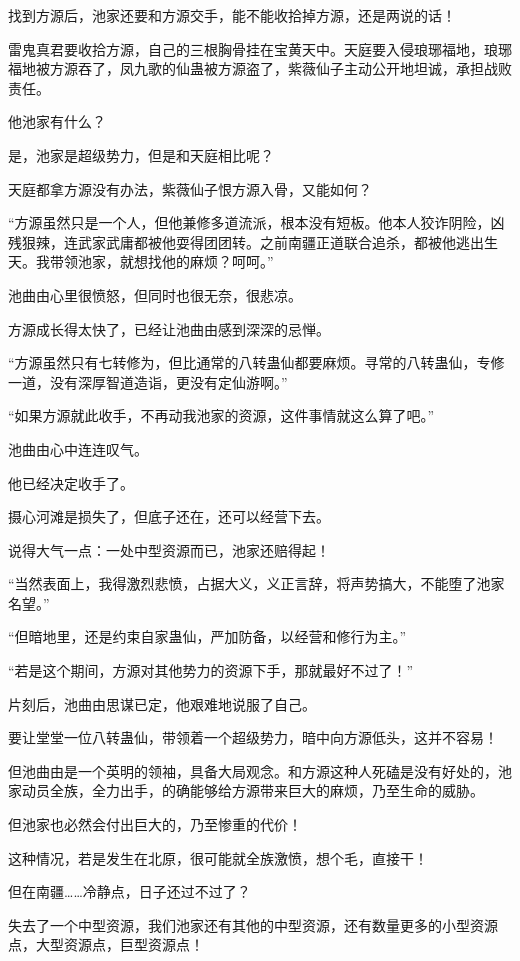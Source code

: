 \begin{this_body}
找到方源后，池家还要和方源交手，能不能收拾掉方源，还是两说的话！

雷鬼真君要收拾方源，自己的三根胸骨挂在宝黄天中。天庭要入侵琅琊福地，琅琊福地被方源吞了，凤九歌的仙蛊被方源盗了，紫薇仙子主动公开地坦诚，承担战败责任。

他池家有什么？

是，池家是超级势力，但是和天庭相比呢？

天庭都拿方源没有办法，紫薇仙子恨方源入骨，又能如何？

“方源虽然只是一个人，但他兼修多道流派，根本没有短板。他本人狡诈阴险，凶残狠辣，连武家武庸都被他耍得团团转。之前南疆正道联合追杀，都被他逃出生天。我带领池家，就想找他的麻烦？呵呵。”

池曲由心里很愤怒，但同时也很无奈，很悲凉。

方源成长得太快了，已经让池曲由感到深深的忌惮。

“方源虽然只有七转修为，但比通常的八转蛊仙都要麻烦。寻常的八转蛊仙，专修一道，没有深厚智道造诣，更没有定仙游啊。”

“如果方源就此收手，不再动我池家的资源，这件事情就这么算了吧。”

池曲由心中连连叹气。

他已经决定收手了。

摄心河滩是损失了，但底子还在，还可以经营下去。

说得大气一点：一处中型资源而已，池家还赔得起！

“当然表面上，我得激烈悲愤，占据大义，义正言辞，将声势搞大，不能堕了池家名望。”

“但暗地里，还是约束自家蛊仙，严加防备，以经营和修行为主。”

“若是这个期间，方源对其他势力的资源下手，那就最好不过了！”

片刻后，池曲由思谋已定，他艰难地说服了自己。

要让堂堂一位八转蛊仙，带领着一个超级势力，暗中向方源低头，这并不容易！

但池曲由是一个英明的领袖，具备大局观念。和方源这种人死磕是没有好处的，池家动员全族，全力出手，的确能够给方源带来巨大的麻烦，乃至生命的威胁。

但池家也必然会付出巨大的，乃至惨重的代价！

这种情况，若是发生在北原，很可能就全族激愤，想个毛，直接干！

但在南疆……冷静点，日子还过不过了？

失去了一个中型资源，我们池家还有其他的中型资源，还有数量更多的小型资源点，大型资源点，巨型资源点！


\end{this_body}
